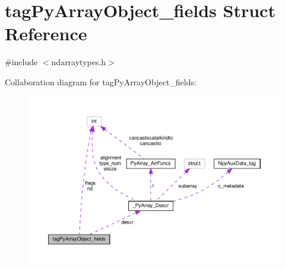 \hypertarget{structtagPyArrayObject__fields}{}\section{tag\+Py\+Array\+Object\+\_\+fields Struct Reference}
\label{structtagPyArrayObject__fields}


{\ttfamily \#include $<$ndarraytypes.\+h$>$}



Collaboration diagram for tag\+Py\+Array\+Object\+\_\+fields\+:
\nopagebreak
\begin{figure}[H]
\begin{center}
\leavevmode
\includegraphics[width=350pt]{structtagPyArrayObject__fields__coll__graph}
\end{center}
\end{figure}
